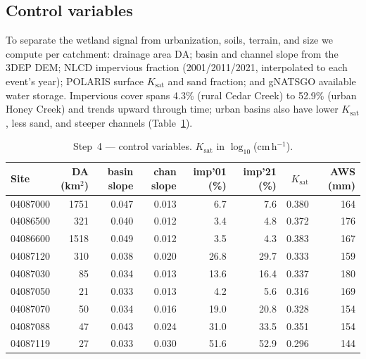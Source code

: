\documentclass[11pt]{article}
\begin{document}
\subsection{Control variables}
To separate the wetland signal from urbanization, soils, terrain, and size we compute per
catchment: drainage area $\mathrm{DA}$; basin and channel slope from the 3DEP DEM; NLCD
impervious fraction (2001/2011/2021, interpolated to each event's year); POLARIS surface
$K_{\text{sat}}$ and sand fraction; and gNATSGO available water storage. Impervious cover
spans 4.3\% (rural Cedar Creek) to 52.9\% (urban Honey Creek) and trends upward through time;
urban basins also have lower $K_{\text{sat}}$, less sand, and steeper channels
(Table~\ref{tab:ctrl}).

\begin{table}[htbp]\centering
\caption{Step~4 --- control variables. $K_{\text{sat}}$ in $\log_{10}$(cm\,h$^{-1}$).}
\label{tab:ctrl}
\small
\begin{tabular}{lrrrrrrr}
\toprule
Site & DA (km$^2$) & basin slope & chan slope & imp'01 (\%) & imp'21 (\%) & $K_{\text{sat}}$ & AWS (mm) \\
\midrule
04087000 & 1751 & 0.047 & 0.013 & 6.7  & 7.6  & 0.380 & 164 \\
04086500 & 321  & 0.040 & 0.012 & 3.4  & 4.8  & 0.372 & 176 \\
04086600 & 1518 & 0.049 & 0.012 & 3.5  & 4.3  & 0.383 & 167 \\
04087120 & 310  & 0.038 & 0.020 & 26.8 & 29.7 & 0.333 & 159 \\
04087030 & 85   & 0.034 & 0.013 & 13.6 & 16.4 & 0.337 & 180 \\
04087050 & 21   & 0.033 & 0.013 & 4.2  & 5.6  & 0.316 & 169 \\
04087070 & 50   & 0.034 & 0.016 & 19.0 & 20.8 & 0.328 & 154 \\
04087088 & 47   & 0.043 & 0.024 & 31.0 & 33.5 & 0.351 & 154 \\
04087119 & 27   & 0.033 & 0.030 & 51.6 & 52.9 & 0.296 & 144 \\
\bottomrule
\end{tabular}
\end{table}
\end{document}
